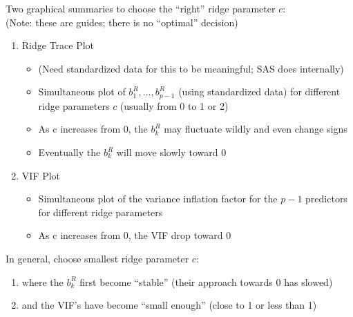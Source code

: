 \documentclass[12pt]{notes}
\begin{document}
\nspace
Two graphical summaries to choose the ``right'' ridge parameter $c$:\\
(Note: these are guides; there is no ``optimal'' decision)
\begin{enumerate}
  \item Ridge Trace Plot
    \begin{itemize}
      \item (Need standardized data for this to be meaningful; SAS does internally)
      \item Simultaneous plot of $b^R_1, \ldots, b^R_{p-1}$ (using standardized data) for different ridge parameters $c$ (usually from 0 to 1 or 2)\\ \vspace{1em}
      \item As c increases from 0, the $b^R_k$ may fluctuate wildly and even change signs
      \item Eventually the $b^R_k$ will move slowly toward 0
    \end{itemize}
  \item VIF Plot
 \begin{itemize}
   \item Simultaneous plot of the variance inflation factor for the $p-1$ predictors for different ridge parameters
   \item As c increases from 0, the VIF drop toward 0
 \end{itemize}

\end{enumerate}

\vspace{1em}

In general, choose smallest ridge parameter $c$:
\begin{enumerate}
   \item where the $b^R_k$ first become ``stable''
   (their approach towards 0 has slowed)
   \item and the VIF's have become ``small enough''
   (close to 1 or less than 1)
\end{enumerate}

\end{document}
